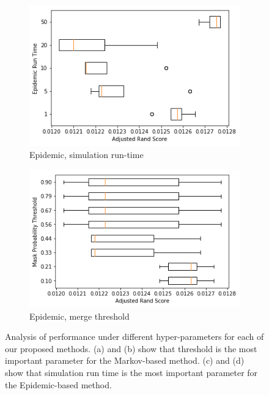 \documentclass[twocolumn]{article}
\newcommand{\figlab}[1]{\label{fig:#1}}
\begin{document}
\begin{figure}[t!]
  \begin{subfigure}{0.49\linewidth}
    \includegraphics[width=\linewidth]{figs/epidemic_run.png}
    \caption{Epidemic, simulation run-time}
  \end{subfigure}
  \begin{subfigure}{0.49\linewidth}
    \includegraphics[width=\linewidth]{figs/epidemic_thresh.png}
    \caption{Epidemic, merge threshold}
  \end{subfigure}

  \caption{
    Analysis of performance under different hyper-parameters for each of our
    proposed methods. (a) and (b) show that threshold is the most important
    parameter for the Markov-based method. (c) and (d) show that simulation run
    time is the most important parameter for the Epidemic-based method.
  }
  \figlab{param_sweep}

\end{figure}
\end{document}
